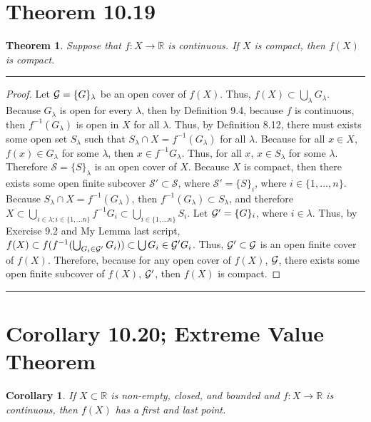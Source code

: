 \documentclass[openany, amssymb, psamsfonts]{amsart}
\newcommand{\bbR}{\mathbb{R}}
\newcommand{\arr}{\longrightarrow}
\newtheorem{thm}{Theorem}[section]
\newtheorem{cor}{Corollary}[section]
\theoremstyle{definition}
\numberwithin{equation}{section}
\begin{document}
\section*{Theorem  10.19}
\begin{thm}  \label{10.19} Suppose that $f\colon X\to \bbR$ is continuous.  If $X$ is compact, then $f(X)$ is compact.
\end{thm}
\vspace{4pt}     \hrule   \vspace{4pt} \begin{proof}
Let $\mathcal G = \{G\}_\lambda$ be an open cover of $f(X)$. Thus, $f(X) \subset \bigcup_\lambda G_\lambda$. Because $G_\lambda$ is open for every $\lambda$, then by Definition 9.4, because $f$ is continuous, then $f^{-1}(G_\lambda)$ is open in $X$ for all $\lambda$. Thus, by Definition 8.12, there must exists some open set $S_\lambda$ such that $S_\lambda \cap X = f^{-1}(G_\lambda)$ for all $\lambda$. Because for all $x\in X$, $f(x) \in G_\lambda$ for some $\lambda$, then $x\in f^{-1}G_\lambda$. Thus, for all $x$, $x\in S_\lambda$ for some $\lambda$. Therefore $\mathcal{S} = \{S\}_\lambda$ is an open cover of $X$. Because $X$ is compact, then there exists some open finite subcover $\mathcal{S}' \subset \mathcal{S}$, where $\mathcal{S}' = \{S\}_i$, where $i\in \{1,...,n\}$. Because $S_\lambda \cap X = f^{-1}(G_\lambda)$, then $f^{-1}(G_\lambda) \subset S_\lambda$, and therefore $X\subset \bigcup_{i\in \lambda; i\in \{1,...n\}}f^{-1}G_i \subset \bigcup_{i\in \{1,...n\}} S_i$. Let $\mathcal G' = \{G\}_i$, where $i\in \lambda$. Thus, by Exercise 9.2 and My Lemma last script, $f(X)\subset f(f^{-1}(\bigcup_{G_i\in \mathcal G'}G_i)) \subset \bigcup {G_i\in \mathcal G'}G_i$. Thus, $\mathcal G'\subset \mathcal G$ is an open finite cover of $f(X)$. Therefore, because for any open cover of $f(X)$, $\mathcal G$, there exists some open finite subcover of $f(X)$, $\mathcal G'$, then $f(X)$ is compact.
\end{proof}\vspace{4pt}     \hrule   \vspace{4pt}

\section*{Corollary 10.20; Extreme Value Theorem}
\begin{cor} \label{10.20} If $X \subset \bbR$ is non-empty, closed, and bounded
and $f\colon X \arr \bbR$ is continuous, then 
$f(X)$ has a first and last point.
\end{cor}
\end{document}
